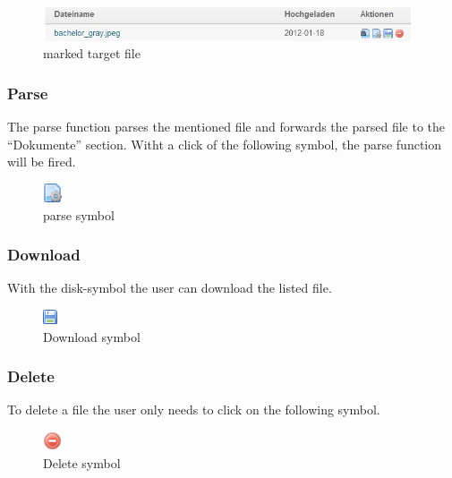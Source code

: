 \begin{figure}[!ht]
  \centering
    \includegraphics[width=0.97\textwidth]{images/basic_functionalities/set_target3.jpg}
  \caption{marked target file}
  \label{fig:target file}
\end{figure}

\subsubsection{Parse}

The parse function parses the mentioned file and forwards the parsed file to the \enquote{Dokumente} section.
Witht a click of the following symbol, the parse function will be fired.

\begin{figure}[!ht]
  \centering
    \includegraphics[width=0.05\textwidth]{images/page_gear.png}
  \caption{parse symbol}
  \label{fig:parse symbol}
\end{figure}

\subsubsection{Download}

With the disk-symbol the user can download the listed file.

\begin{figure}[!ht]
  \centering
    \includegraphics{images/disk.png}
  \caption{Download symbol}
  \label{fig:download symbol}
\end{figure}

\subsubsection{Delete}

To delete a file the user only needs to click on the following symbol.

\begin{figure}[!ht]
  \centering
    \includegraphics[width=0.05\textwidth]{images/delete.png}
  \caption{Delete symbol}
  \label{fig:delete symbol}
\end{figure}

